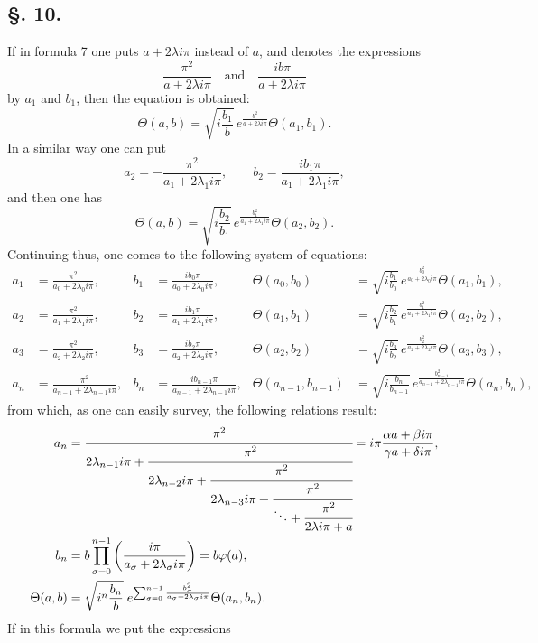 \documentclass[10pt]{article}
\newcommand{\sourceanchor}[1]{\hypertarget{source-#1}{}}
\begin{document}
\subsection*{\S. 10.}
If in formula 7 one puts \(a+2\lambda i\pi\) instead of \(a\), and denotes the expressions
\[
\frac{\pi^{2}}{a+2\lambda i\pi}\quad\text{and}\quad \frac{ib\pi}{a+2\lambda i\pi}
\]
by \(a_1\) and \(b_1\), then the equation is obtained:
\[
\Theta(a,b)=\sqrt{i\frac{b_1}{b}}\,e^{\frac{b^{2}}{a+2\lambda i\pi}}\Theta(a_1,b_1).
\]
In a similar way one can put
\[
a_2=-\frac{\pi^{2}}{a_1+2\lambda_1 i\pi},\qquad
b_2=\frac{i b_1\pi}{a_1+2\lambda_1 i\pi},
\]
and then one has
\[
\Theta(a,b)=\sqrt{i\frac{b_2}{b_1}}\,e^{\frac{b_1^{2}}{a_1+2\lambda_1 i\pi}}\Theta(a_2,b_2).
\]
Continuing thus, one comes to the following system of equations:
\begin{align*}
a_1&=\frac{\pi^{2}}{a_0+2\lambda_0 i\pi},&
 b_1&=\frac{i b_0\pi}{a_0+2\lambda_0 i\pi},&
 \Theta(a_0,b_0)&=\sqrt{i\frac{b_1}{b_0}}\,e^{\frac{b_0^{2}}{a_0+2\lambda_0 i\pi}}\Theta(a_1,b_1),\\
a_2&=\frac{\pi^{2}}{a_1+2\lambda_1 i\pi},&
 b_2&=\frac{i b_1\pi}{a_1+2\lambda_1 i\pi},&
 \Theta(a_1,b_1)&=\sqrt{i\frac{b_2}{b_1}}\,e^{\frac{b_1^{2}}{a_1+2\lambda_1 i\pi}}\Theta(a_2,b_2),\\
a_3&=\frac{\pi^{2}}{a_2+2\lambda_2 i\pi},&
 b_3&=\frac{i b_2\pi}{a_2+2\lambda_2 i\pi},&
 \Theta(a_2,b_2)&=\sqrt{i\frac{b_3}{b_2}}\,e^{\frac{b_2^{2}}{a_2+2\lambda_2 i\pi}}\Theta(a_3,b_3),\\
a_n&=\frac{\pi^{2}}{a_{n-1}+2\lambda_{n-1}i\pi},&
 b_n&=\frac{i b_{n-1}\pi}{a_{n-1}+2\lambda_{n-1}i\pi},&
 \Theta(a_{n-1},b_{n-1})&=\sqrt{i\frac{b_n}{b_{n-1}}}\,e^{\frac{b_{n-1}^{2}}{a_{n-1}+2\lambda_{n-1}i\pi}}\Theta(a_n,b_n),
\end{align*}
from which, as one can easily survey, the following relations result:
\begin{align*}
a_n&=\cfrac{\pi^{2}}{2\lambda_{n-1}i\pi+\cfrac{\pi^{2}}{2\lambda_{n-2}i\pi+\cfrac{\pi^{2}}{2\lambda_{n-3}i\pi+\cfrac{\pi^{2}}{\ddots+\cfrac{\pi^{2}}{2\lambda i\pi+a}}}}}
    =i\pi\frac{\alpha a+\beta i\pi}{\gamma a+\delta i\pi},\\
b_n&=b\prod_{\sigma=0}^{n-1}\left(\frac{i\pi}{a_\sigma+2\lambda_\sigma i\pi}\right)=b\varphi(a),\\
\Theta(a,b)&=\sqrt{i^{n}\frac{b_n}{b}}\;e^{\sum_{\sigma=0}^{n-1}\frac{b_\sigma^{2}}{a_\sigma+2\lambda_\sigma i\pi}}\Theta(a_n,b_n).
\end{align*}
\sourceanchor{PA09}
If in this formula we put the expressions
\end{document}

